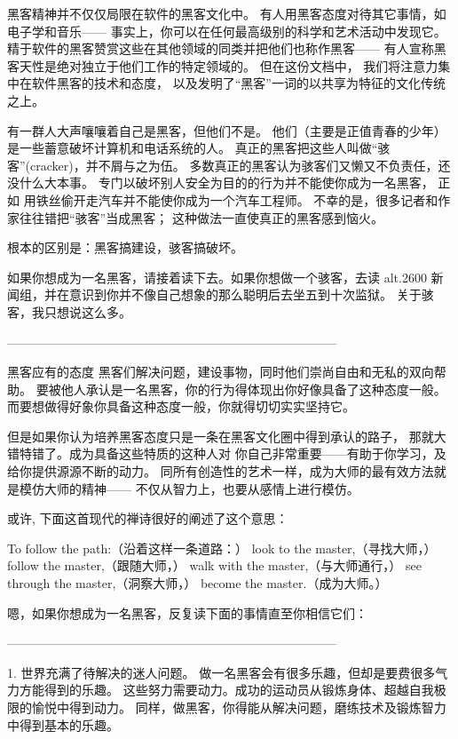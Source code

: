 \documentclass[a4paper,12pt,UTF8,twoside]{ctexbook}
\begin{document}
黑客精神并不仅仅局限在软件的黑客文化中。 有人用黑客态度对待其它事情，如电子学和音乐—— 事实上，你可以在任何最高级别的科学和艺术活动中发现它。 精于软件的黑客赞赏这些在其他领域的同类并把他们也称作黑客—— 有人宣称黑客天性是绝对独立于他们工作的特定领域的。 但在这份文档中， 我们将注意力集中在软件黑客的技术和态度， 以及发明了“黑客”一词的以共享为特征的文化传统之上。

有一群人大声嚷嚷着自己是黑客，但他们不是。 他们（主要是正值青春的少年）是一些蓄意破坏计算机和电话系统的人。 真正的黑客把这些人叫做“骇客”(cracker)，并不屑与之为伍。 多数真正的黑客认为骇客们又懒又不负责任，还没什么大本事。 专门以破坏别人安全为目的的行为并不能使你成为一名黑客， 正如 用铁丝偷开走汽车并不能使你成为一个汽车工程师。 不幸的是，很多记者和作家往往错把“骇客”当成黑客； 这种做法一直使真正的黑客感到恼火。

根本的区别是：黑客搞建设，骇客搞破坏。

如果你想成为一名黑客，请接着读下去。如果你想做一个骇客，去读 alt.2600 新闻组，并在意识到你并不像自己想象的那么聪明后去坐五到十次监狱。 关于骇客，我只想说这么多。


--------------------------------------------------------------------------------

黑客应有的态度
黑客们解决问题，建设事物，同时他们崇尚自由和无私的双向帮助。 要被他人承认是一名黑客，你的行为得体现出你好像具备了这种态度一般。 而要想做得好象你具备这种态度一般，你就得切切实实坚持它。

但是如果你认为培养黑客态度只是一条在黑客文化圈中得到承认的路子， 那就大错特错了。成为具备这些特质的这种人对 你自己非常重要——有助于你学习，及给你提供源源不断的动力。 同所有创造性的艺术一样，成为大师的最有效方法就是模仿大师的精神—— 不仅从智力上，也要从感情上进行模仿。

或许, 下面这首现代的禅诗很好的阐述了这个意思：

To follow the path:（沿着这样一条道路：）
look to the master,（寻找大师，）
follow the master,（跟随大师，）
walk with the master,（与大师通行，）
see through the master,（洞察大师，）
become the master.（成为大师。）

嗯，如果你想成为一名黑客，反复读下面的事情直至你相信它们：


--------------------------------------------------------------------------------

1. 世界充满了待解决的迷人问题。
做一名黑客会有很多乐趣，但却是要费很多气力方能得到的乐趣。 这些努力需要动力。成功的运动员从锻炼身体、超越自我极限的愉悦中得到动力。 同样，做黑客，你得能从解决问题，磨练技术及锻炼智力中得到基本的乐趣。
\end{document}
